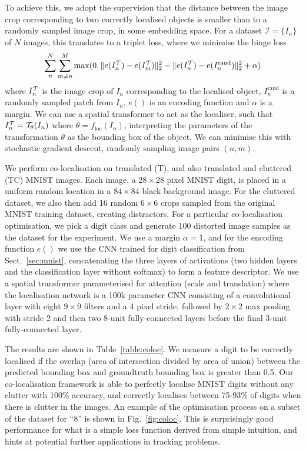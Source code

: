 \documentclass{article} %
\newcommand{\figref}[1]{Fig.~\ref{#1}}
\newcommand{\tblref}[1]{Table~\ref{#1}}
\newcommand{\sref}[1]{Sect.~\ref{#1}}
\begin{document}
\begin{appendices}
To achieve this, we adopt the supervision that the distance between the image crop corresponding to two correctly localised objects is smaller than to a randomly sampled image crop, in some embedding space. For a dataset ${\mathcal I} = \{I_n\}$ of $N$ images, this translates to a triplet loss, where we minimise the hinge loss
\begin{equation}
\sum_{n}^{N} \sum_{m\ne n}^M \max(0, \|e(I_n^{\cal T}) - e(I_m^{\cal T})\|^2_2 - \|e(I_n^{\cal T}) - e(I_n^\text{rand})\|^2_2 + \alpha)
\label{eqn:hinge}
\end{equation}
where $I_n^{\cal T}$ is the image crop of $I_n$ corresponding to the localised object, $I_n^\text{rand}$ is a randomly sampled patch from $I_n$, $e()$ is an encoding function and $\alpha$ is a margin. We can use a spatial transformer to act as the localiser, such that $I_n^{\cal T} =  {\cal T}_\theta (I_n)$ where $\theta = f_\text{loc}(I_n)$, interpreting the parameters of the transformation $\theta$ as the bounding box of the object. We can minimise this with stochastic gradient descent, randomly sampling image pairs $(n,m)$.

We perform co-localisation on translated (T), and also translated and cluttered (TC) MNIST images. Each image, a $28\times 28$ pixel MNIST digit, is placed in a uniform random location in a $84\times 84$ black background image. For the cluttered dataset, we also then add 16 random $6\times 6$ crops sampled from the original MNIST training dataset, creating distractors. For a particular co-localisation optimisation, we pick a digit class and generate 100 distorted image samples as the dataset for the experiment. We use a margin $\alpha=1$, and for the encoding function $e()$ we use the CNN trained for digit classification from \sref{sec:mnist}, concatenating the three layers of activations (two hidden layers and the classification layer without softmax) to form a feature descriptor. We use a spatial transformer parameterised for attention (scale and translation) where the localisation network is a 100k parameter CNN consisting of a convolutional layer with eight $9\times 9$ filters and a 4 pixel stride, followed by $2\times 2$ max pooling with stride 2 and then two 8-unit fully-connected layers before the final 3-unit fully-connected layer.

The results are shown in \tblref{table:coloc}. We measure a digit to be correctly localised if the overlap (area of intersection divided by area of union) between the predicted bounding box and groundtruth bounding box is greater than 0.5. Our co-localisation framework is able to perfectly localise MNIST digits without any clutter with 100\% accuracy, and correctly localises between 75-93\% of digits when there is clutter in the images. An example of the optimisation process on a subset of the dataset for ``8'' is shown in \figref{fig:coloc}. This is surprisingly good performance for what is a simple loss function derived from simple intuition, and hints at potential further applications in tracking problems.


\end{appendices}
\end{document}
